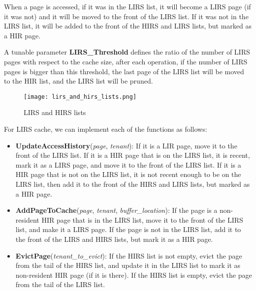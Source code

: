When a page is accessed, if it was in the LIRS list, it will become a LIRS page (if it was not)
and it will be moved to the front of the LIRS list. If it was not in the LIRS list, it will be
added to the front of the HIRS and LIRS lists, but marked as a HIR page.

A tunable parameter \textbf{LIRS\_Threshold} defines the ratio of the number of
LIRS pages with respect to the cache size, after each operation, if the number of LIRS pages is
bigger than this threshold, the last page of the LIRS list will be moved to the HIR list, and
the LIRS list will be pruned.

\begin{figure}[H]
    \centering
    \begin{minipage}{0.5\textwidth}
        \centering
        \texttt{[image: lirs\_and\_hirs\_lists.png]}
        \caption{LIRS and HIRS lists}
        \label{fig:lirs_and_hirs_lists}
    \end{minipage}
    \hfill
\end{figure}

For LIRS cache, we can implement each of the functions as follows:

\begin{itemize}
    \item \textbf{UpdateAccessHistory}(\textit{page}, \textit{tenant}): If it is a LIR page, move it
    to the front of the LIRS list. If it is a HIR page that is on the LIRS list, it is recent, mark it 
    as a LIRS page, and move it to the front of the LIRS list. If it is a HIR page that is not on the LIRS
    list, it is not recent enough to be on the LIRS list, then add it to the front of the HIRS and LIRS lists,
    but marked as a HIR page.
    \item \textbf{AddPageToCache}(\textit{page}, \textit{tenant}, \textit{buffer\_location}): If the page 
    is a non-resident HIR page that is in the LIRS list, move it to the front of the LIRS list, and make it a 
    LIRS page. If the page is not in the LIRS list, add it to the front of the LIRS and HIRS lists, but mark it
    as a HIR page.
    \item \textbf{EvictPage}(\textit{tenant\_to\_evict}): If the HIRS list is not empty, evict the page from the 
    tail of the HIRS list, and update it in the LIRS list to mark it as non-resident HIR page (if it is there). 
    If the HIRS list is empty, evict the page from the tail of the LIRS list.
\end{itemize}

